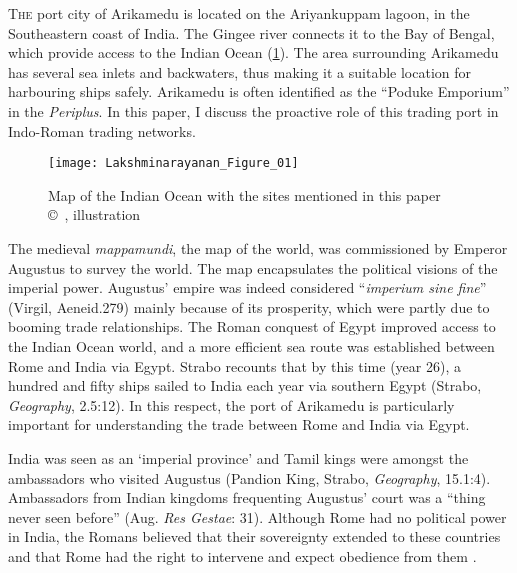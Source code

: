 \lettrine{T}{he} port city of Arikamedu is located on the Ariyankuppam lagoon, in the Southeastern coast of India. The Gingee river connects it to the Bay of Bengal, which provide access to the Indian Ocean (\cref{fig:Lakshminarayanan_Figure_01}). The area surrounding Arikamedu has several sea inlets and backwaters, thus making it a suitable location for harbouring ships safely. Arikamedu is often identified as the “Poduke Emporium” in the \emph{Periplus}. In this paper, I discuss the proactive role of this trading port in Indo-Roman trading networks.

\begin{figure}[!htb]
	\texttt{[image: Lakshminarayanan\_Figure\_01]}
	\caption{Map of the Indian Ocean with the sites mentioned in this paper\\
		{\normalfont\scriptsize\copyright\
			\shortauthor, illustration
	}}
	\label{fig:Lakshminarayanan_Figure_01}
\end{figure}

The medieval \emph{mappamundi}, the map of the world, was commissioned by Emperor Augustus to survey the world. The map encapsulates the political visions of the imperial power. Augustus’ empire was indeed considered “\emph{imperium sine fine}” (Virgil, Aeneid.279) mainly because of its prosperity, which were partly due to booming trade relationships. The Roman conquest of Egypt improved access to the Indian Ocean world, and a more efficient sea route was established between Rome and India via Egypt. Strabo recounts that by this time (year 26), a hundred and fifty ships sailed to India each year via southern Egypt (Strabo, \emph{Geography}, 2.5:12). In this respect, the port of Arikamedu is particularly important for understanding the trade between Rome and India via Egypt.

India was seen as an ‘imperial province’ and Tamil kings were amongst the ambassadors who visited Augustus (Pandion King, Strabo, \emph{Geography}, 15.1:4). Ambassadors from Indian kingdoms frequenting Augustus’ court was a “thing never seen before” (Aug. \emph{Res Gestae}: 31). Although Rome had no political power in India, the Romans believed that their sovereignty extended to these countries and that Rome had the right to intervene and expect obedience from them \parencite[][34-37]{whittaker1994}.

